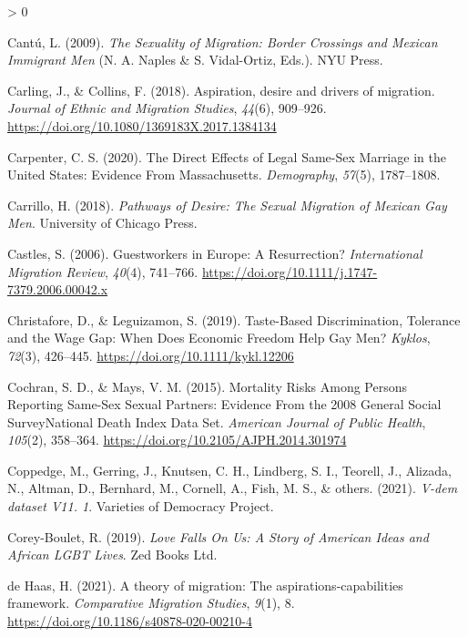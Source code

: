 \documentclass[
  12pt,
]{article}
\newlength{\cslhangindent}
\newenvironment{CSLReferences}[2] %
 {%
  \setlength{\parindent}{0pt}
  \ifodd #1 \everypar{\setlength{\hangindent}{\cslhangindent}}\ignorespaces\fi
  \ifnum #2 > 0
  \setlength{\parskip}{#2\baselineskip}
  \fi
 }%
 {}
\begin{document}
\begin{CSLReferences}{1}{0}
\leavevmode\hypertarget{ref-cantu_2009}{}%
Cantú, L. (2009). \emph{The {Sexuality} of {Migration}: Border {Crossings} and {Mexican Immigrant Men}} (N. A. Naples \& S. Vidal-Ortiz, Eds.). {NYU Press}.

\leavevmode\hypertarget{ref-carling_2018_aspiration}{}%
Carling, J., \& Collins, F. (2018). Aspiration, desire and drivers of migration. \emph{Journal of Ethnic and Migration Studies}, \emph{44}(6), 909--926. \url{https://doi.org/10.1080/1369183X.2017.1384134}

\leavevmode\hypertarget{ref-carpenter_2020}{}%
Carpenter, C. S. (2020). The {Direct Effects} of {Legal Same}-{Sex Marriage} in the {United States}: Evidence {From Massachusetts}. \emph{Demography}, \emph{57}(5), 1787--1808.

\leavevmode\hypertarget{ref-carrillo_2018}{}%
Carrillo, H. (2018). \emph{Pathways of {Desire}: The {Sexual Migration} of {Mexican Gay Men}}. {University of Chicago Press}.

\leavevmode\hypertarget{ref-castles_2006}{}%
Castles, S. (2006). Guestworkers in {Europe}: A {Resurrection}? \emph{International Migration Review}, \emph{40}(4), 741--766. \url{https://doi.org/10.1111/j.1747-7379.2006.00042.x}

\leavevmode\hypertarget{ref-christafore_2019}{}%
Christafore, D., \& Leguizamon, S. (2019). Taste-{Based Discrimination}, {Tolerance} and the {Wage Gap}: When {Does Economic Freedom Help Gay Men}? \emph{Kyklos}, \emph{72}(3), 426--445. \url{https://doi.org/10.1111/kykl.12206}

\leavevmode\hypertarget{ref-cochran_2015_mortality}{}%
Cochran, S. D., \& Mays, V. M. (2015). Mortality {Risks Among Persons Reporting Same}-{Sex Sexual Partners}: Evidence {From} the 2008 {General Social Survey}{{National Death Index Data Set}}. \emph{American Journal of Public Health}, \emph{105}(2), 358--364. \url{https://doi.org/10.2105/AJPH.2014.301974}

\leavevmode\hypertarget{ref-coppedge_2021}{}%
Coppedge, M., Gerring, J., Knutsen, C. H., Lindberg, S. I., Teorell, J., Alizada, N., Altman, D., Bernhard, M., Cornell, A., Fish, M. S., \& others. (2021). \emph{V-dem dataset V11. 1}. {Varieties of Democracy Project}.

\leavevmode\hypertarget{ref-corey-boulet_2019}{}%
Corey-Boulet, R. (2019). \emph{Love {Falls On Us}: A {Story} of {American Ideas} and {African LGBT Lives}}. {Zed Books Ltd.}

\leavevmode\hypertarget{ref-dehaas_2021}{}%
de Haas, H. (2021). A theory of migration: The aspirations-capabilities framework. \emph{Comparative Migration Studies}, \emph{9}(1), 8. \url{https://doi.org/10.1186/s40878-020-00210-4}


\end{CSLReferences}
\end{document}
